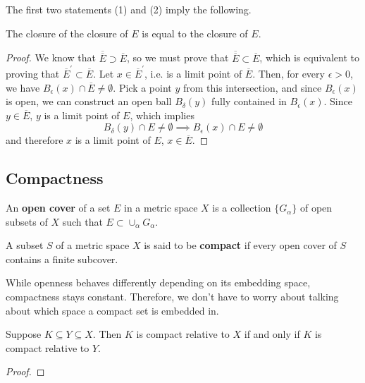 \documentclass{article}
\begin{document}
    The first two statements (1) and (2) imply the following. 

    \begin{corollary}
      The closure of the closure of $E$ is equal to the closure of $E$. 
    \end{corollary}
    \begin{proof}
      We know that $\overline{\overline{E}} \supset \overline{E}$, so we must prove that $\overline{\overline{E}} \subset \overline{E}$, which is equivalent to proving that $\overline{E}^\prime \subset \overline{E}$. Let $x \in \overline{E}^\prime$, i.e. is a limit point of $\overline{E}$. Then, for every $\epsilon > 0$, we have $B_\epsilon (x) \cap \overline{E} \neq \emptyset$. Pick a point $y$ from this intersection, and since $B_\epsilon (x)$ is open, we can construct an open ball $B_\delta (y)$ fully contained in $B_\epsilon (x)$. Since $y \in \overline{E}$, $y$ is a limit point of $E$, which implies 
      \begin{equation}
        B_\delta (y) \cap E \neq \emptyset \implies B_\epsilon (x) \cap E \neq \emptyset
      \end{equation}
      and therefore $x$ is a limit point of $E$, $x \in \overline{E}$. 
    \end{proof}

  \subsection{Compactness}

    \begin{definition}
      An \textbf{open cover} of a set $E$ in a metric space $X$ is a collection $\{G_\alpha\}$ of open subsets of $X$ such that $E \subset \cup_\alpha G_\alpha$. 
    \end{definition}

    \begin{definition}
      A subset $S$ of a metric space $X$ is said to be \textbf{compact} if every open cover of $S$ contains a finite subcover. 
    \end{definition}

    While openness behaves differently depending on its embedding space, compactness stays constant. Therefore, we don't have to worry about talking about which space a compact set is embedded in. 

    \begin{theorem}
      Suppose $K \subseteq Y \subseteq X$. Then $K$ is compact relative to $X$ if and only if $K$ is compact relative to $Y$. 
    \end{theorem}
    \begin{proof}

    \end{proof}
\end{document}
